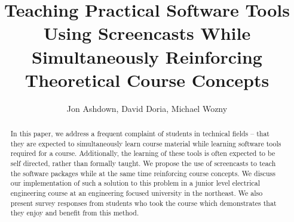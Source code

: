\documentclass[a4paper,10pt]{article}
\title{Teaching Practical Software Tools Using Screencasts While Simultaneously Reinforcing Theoretical Course Concepts}
\author{Jon Ashdown, David Doria, Michael Wozny}
\begin{document}
\maketitle

\begin{abstract}
In this paper, we address a frequent complaint of students in technical fields – that they are expected to simultaneously learn course material while learning software tools required for a course. Additionally, the learning of these tools is often expected to be self directed, rather than formally taught. We propose the use of screencasts to teach the software packages while at the same time reinforcing course concepts. We discuss our implementation of such a solution to this problem in a junior level electrical engineering course at an engineering focused university in the northeast. We also present survey responses from students who took the course which demonstrates that they enjoy and benefit from this method.
\end{abstract}

\end{document}
